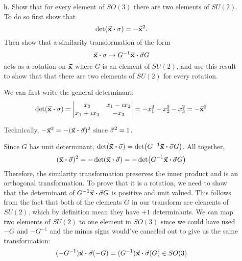 \documentclass[a4paper,twoside]{article}
\begin{document}
\begin{itemize}
    \item[h.] Show that for every element of $ SO(3) $ there are two elements of $ SU(2) $. To do so first show that
        \begin{equation}
            \det(\va{x} \vdot \sigma) = -\va{ x}^2.
        \end{equation}
        Then show that a similarity transformation of the form
        \begin{equation}
            \va{ x} \vdot \sigma \to G^{-1}\va{ x} \vdot \va{\sigma} G
        \end{equation}
        acts as a rotation on $\va{ x} $ where $ G $ is an element of $ SU(2) $, and use this result to show that that there are two elements of $ SU(2) $ for every rotation.
        \begin{problem}
            We can first write the general determinant:
            \begin{equation}
                \det(\va{x} \vdot \sigma) = \mdet{x_3 & x_1 - \imath x_2 \\ x_1 + \imath x_2 & - x_3} = - x_1^2 - x_2^2 - x_3^2 = -\va{ x}^2
            \end{equation}

            Technically, $ -\va{ x}^2 = -(\va{ x} \vdot \va{\sigma})^2 $ since $ \va{\sigma}^2 = 1 $.

            Since $ G $ has unit determinant, $ \det(\va{x} \vdot \va{\sigma}) = \det(G^{-1}\va{ x} \vdot \va{\sigma} G) $. All together,
            \begin{equation}
                (\va{x} \vdot \va{\sigma})^2 = -\det(\va{x} \vdot \va{\sigma}) = -\det(G^{-1}\va{ x} \vdot \va{\sigma} G)
            \end{equation}
            Therefore, the similarity transformation preserves the inner product and is an orthogonal transformation. To prove that it is a rotation, we need to show that the determinant of $ G^{-1}\va{ x} \vdot \va{\sigma} G $ is positive and unit valued. This follows from the fact that both of the elements $ G $ in our transform are elements of $ SU(2) $, which by definition mean they have $ +1 $ determinants. We can map two elements of $ SU(2) $ to one element in $ SO(3) $ since we could have used $ -G $ and $ -G^{-1} $ and the minus signs would've canceled out to give us the same transformation:
            \begin{equation}
                (- G^{-1})\va{ x} \vdot \va{\sigma} (-G) = (G^{-1})\va{ x} \vdot \va{\sigma} (G) \in SO(3)
            \end{equation}
    \end{problem}
\end{itemize}
\end{document}
